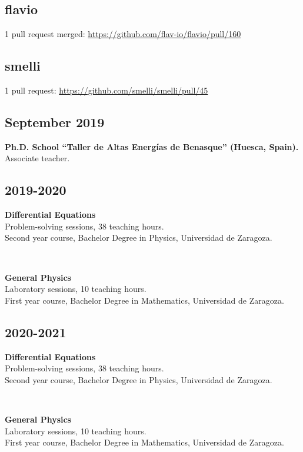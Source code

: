 \documentclass{cvf}
\begin{document}

\subsection{flavio}
1 pull request merged: \url{https://github.com/flav-io/flavio/pull/160}

\subsection{smelli}
1 pull request: \url{https://github.com/smelli/smelli/pull/45}


\subsection{September 2019}
\hspace{\parindent}\textbf{Ph.D. School ``Taller de Altas Energías de Benasque'' (Huesca, Spain).}\\
Associate teacher.

\subsection{2019-2020}
\hspace{\parindent}\textbf{Differential Equations}\\
Problem-solving sessions, 38 teaching hours.\\
Second year course, Bachelor Degree in Physics, Universidad de Zaragoza.

~

\textbf{General Physics}\\
Laboratory sessions, 10 teaching hours.\\
First year course, Bachelor Degree in Mathematics, Universidad de Zaragoza.

\subsection{2020-2021}
\hspace{\parindent}\textbf{Differential Equations}\\
Problem-solving sessions, 38 teaching hours.\\
Second year course, Bachelor Degree in Physics, Universidad de Zaragoza.

~

\textbf{General Physics}\\
Laboratory sessions, 10 teaching hours.\\
First year course, Bachelor Degree in Mathematics, Universidad de Zaragoza.
\end{document}
